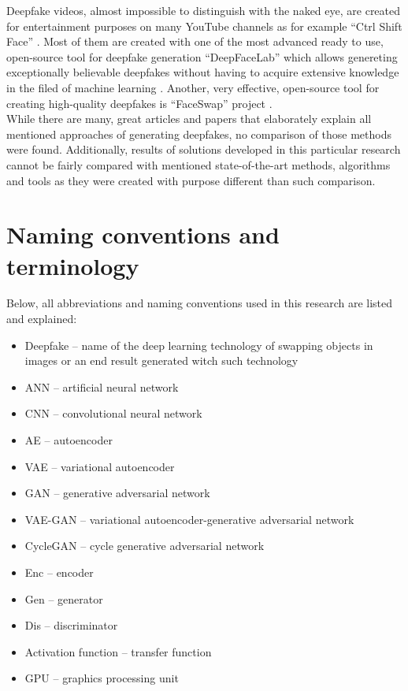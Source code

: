 Deepfake videos, almost impossible to distinguish with the naked eye, are created for entertainment purposes on many YouTube channels as for example ``Ctrl Shift Face'' \cite{ctrl_shift_face_bib}. Most of them are created with one of the most advanced ready to use, open-source tool for deepfake generation ``DeepFaceLab'' which allows genereting exceptionally believable deepfakes without having to acquire extensive knowledge in the filed of machine learning \cite{DeepFaceLab_bib}. Another, very effective, open-source tool for creating high-quality deepfakes is ``FaceSwap'' project \cite{faceswap_bib}.\\

While there are many, great articles and papers that elaborately explain all mentioned approaches of generating deepfakes, no comparison of those methods were found. Additionally, results of solutions developed in this particular research cannot be fairly compared with mentioned state-of-the-art methods, algorithms and tools as they were created with purpose different than such comparison.

\section{Naming conventions and terminology}
Below, all abbreviations and naming conventions used in this research are listed and explained:

\begin{itemize}
\item Deepfake -- name of the deep learning technology of swapping objects in images or an end result generated witch such technology
\item ANN -- artificial neural network
\item CNN -- convolutional neural network
\item AE -- autoencoder
\item VAE -- variational autoencoder
\item GAN -- generative adversarial network
\item VAE-GAN -- variational autoencoder-generative adversarial network
\item CycleGAN -- cycle generative adversarial network
\item Enc -- encoder
\item Gen -- generator
\item Dis -- discriminator
\item Activation function -- transfer function
\item GPU -- graphics processing unit
\end{itemize}